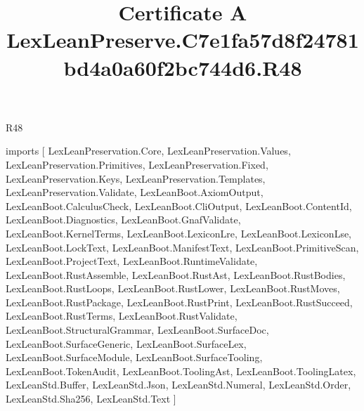 \begin{lexlean}{R48}
\title{Certificate A LexLeanPreserve.C7e1fa57d8f24781bd4a0a60f2bc744d6.R48}
\begin{coremodule}
imports [
  LexLeanPreservation.Core,
  LexLeanPreservation.Values,
  LexLeanPreservation.Primitives,
  LexLeanPreservation.Fixed,
  LexLeanPreservation.Keys,
  LexLeanPreservation.Templates,
  LexLeanPreservation.Validate,
  LexLeanBoot.AxiomOutput,
  LexLeanBoot.CalculusCheck,
  LexLeanBoot.CliOutput,
  LexLeanBoot.ContentId,
  LexLeanBoot.Diagnostics,
  LexLeanBoot.GnafValidate,
  LexLeanBoot.KernelTerms,
  LexLeanBoot.LexiconLre,
  LexLeanBoot.LexiconLse,
  LexLeanBoot.LockText,
  LexLeanBoot.ManifestText,
  LexLeanBoot.PrimitiveScan,
  LexLeanBoot.ProjectText,
  LexLeanBoot.RuntimeValidate,
  LexLeanBoot.RustAssemble,
  LexLeanBoot.RustAst,
  LexLeanBoot.RustBodies,
  LexLeanBoot.RustLoops,
  LexLeanBoot.RustLower,
  LexLeanBoot.RustMoves,
  LexLeanBoot.RustPackage,
  LexLeanBoot.RustPrint,
  LexLeanBoot.RustSucceed,
  LexLeanBoot.RustTerms,
  LexLeanBoot.RustValidate,
  LexLeanBoot.StructuralGrammar,
  LexLeanBoot.SurfaceDoc,
  LexLeanBoot.SurfaceGeneric,
  LexLeanBoot.SurfaceLex,
  LexLeanBoot.SurfaceModule,
  LexLeanBoot.SurfaceTooling,
  LexLeanBoot.TokenAudit,
  LexLeanBoot.ToolingAst,
  LexLeanBoot.ToolingLatex,
  LexLeanStd.Buffer,
  LexLeanStd.Json,
  LexLeanStd.Numeral,
  LexLeanStd.Order,
  LexLeanStd.Sha256,
  LexLeanStd.Text
]


\end{coremodule}
\end{lexlean}
